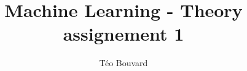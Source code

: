 \documentclass[a4paper, 12pt, twoside]{report}
\begin{document}
\title{Machine Learning - Theory assignement 1}
\author{T\'eo Bouvard}
\maketitle
\end{document}
